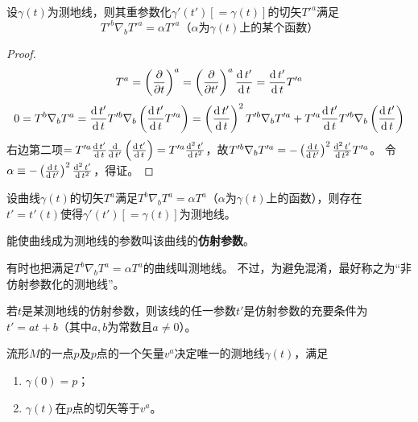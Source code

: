 \begin{theorem}
设$\gamma(t)$为测地线，则其重参数化$\gamma'(t')[= \gamma(t)]$的切矢$T'^a$满足
$$T'^b\nabla_bT'^a = \alpha T'^a\text{（$\alpha$为$\gamma(t)$上的某个函数）}$$
\end{theorem}

\begin{proof}
$$T^a = \left(\frac{\partial}{\partial t}\right)^a = \left(\frac{\partial}{\partial t'}\right)^a\frac{\operatorname{d} t'}{\operatorname{d} t} = \frac{\operatorname{d} t'}{\operatorname{d} t}T'^a$$
$$0 = T^b\nabla_bT^a = \frac{\operatorname{d} t'}{\operatorname{d} t}T'^b\nabla_b\left(\frac{\operatorname{d} t'}{\operatorname{d} t}T'^a\right) = \left(\frac{\operatorname{d} t'}{\operatorname{d} t}\right)^2T'^b\nabla_bT'^a + T'^a\frac{\operatorname{d} t'}{\operatorname{d} t}T'^b\nabla_b\left(\frac{\operatorname{d} t'}{\operatorname{d} t}\right)$$
右边第二项$= T'^a\frac{\operatorname{d} t'}{\operatorname{d} t}\frac{\operatorname{d}}{\operatorname{d} t'}\left(\frac{\operatorname{d} t'}{\operatorname{d} t}\right) = T'^a\frac{\operatorname{d}^2t'}{\operatorname{d} t^2}$，故$T'^b\nabla_bT'^a = -\left(\frac{\operatorname{d} t}{\operatorname{d} t'}\right)^2\frac{\operatorname{d}^2t'}{\operatorname{d} t^2}T'^a$。
令$\alpha \equiv -\left(\frac{\operatorname{d} t}{\operatorname{d} t'}\right)^2\frac{\operatorname{d}^2t'}{\operatorname{d} t^2}$，得证。
\end{proof}

\begin{theorem}
设曲线$\gamma(t)$的切矢$T^a$满足$T^b\nabla_bT^a = \alpha T^a$（$\alpha$为$\gamma(t)$上的函数），则存在$t' = t'(t)$使得$\gamma'(t')[= \gamma(t)]$为测地线。
\end{theorem}

\begin{definition}
能使曲线成为测地线的参数叫该曲线的\textbf{仿射参数}。
\end{definition}

\begin{note}
有时也把满足$T^b\nabla_bT^a = \alpha T^a$的曲线叫测地线。
不过，为避免混淆，最好称之为``非仿射参数化的测地线''。
\end{note}

\begin{theorem}
若$t$是某测地线的仿射参数，则该线的任一参数$t'$是仿射参数的充要条件为$t' = at +b$（其中$a, b$为常数且$a \neq 0$）。
\end{theorem}

\begin{theorem}
流形$M$的一点$p$及$p$点的一个矢量$v^a$决定唯一的测地线$\gamma(t)$，满足
\begin{enumerate}[（1）]
\item $\gamma(0) = p$；
\item $\gamma(t)$在$p$点的切矢等于$v^a$。
\end{enumerate}
\end{theorem}

